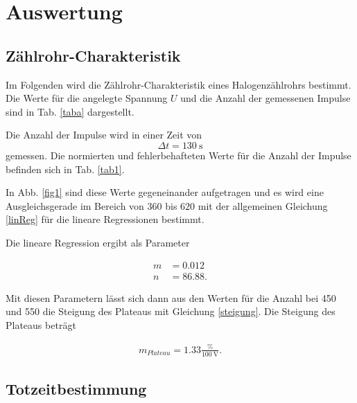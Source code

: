 \section{Auswertung}
\label{sec:Auswertung}


\subsection{Zählrohr-Charakteristik}

Im Folgenden wird die Zählrohr-Charakteristik eines Halogenzählrohrs bestimmt. Die Werte für die angelegte Spannung $U$ und die Anzahl der gemessenen Impulse sind in Tab. \ref{taba} dargestellt. 



\noindnet Die Anzahl der Impulse wird in einer Zeit von 
\begin{equation*}
    \Delta t = \SI{130}{\second}
\end{equation*}
gemessen. 
Die normierten und fehlerbehafteten Werte für die Anzahl der Impulse befinden sich in Tab. \ref{tab1}. 



\noindent In Abb. \ref{fig1} sind diese Werte gegeneinander aufgetragen und es wird eine Ausgleichsgerade im Bereich von $\num{360}$ bis $\num{620}$ mit der allgemeinen Gleichung \eqref{linReg} für die lineare Regressionen bestimmt. 

\begin{figure}

\end{figure}

Die lineare Regression ergibt als Parameter

\begin{align*} 
   m &= 0.012 \\
   n &= 86.88.
\end{align*}

Mit diesen Parametern lässt sich dann aus den Werten für die Anzahl bei \num{450} und \num{550} die Steigung des Plateaus mit Gleichung \eqref{steigung}.
Die Steigung des Plateaus beträgt 

\begin{align*} 
    m_{Plateau} = 1.33 \frac{\si{\percent}}{\SI{100}{\volt}}.
\end{align*}

\subsection{Totzeitbestimmung}

